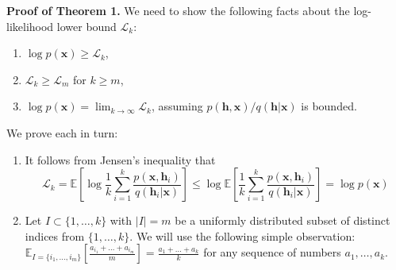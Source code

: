 \documentclass{article} %
\newcommand{\expect}{\mathbb{E}}
\newcommand{\hid}{\mathbf{h}}
\newcommand{\hidS}[1]{\hid_{#1}}
\newcommand{\obs}{\mathbf{x}}
\newcommand{\pmfGen}{p}
\newcommand{\pmfRec}{q}
\newcommand{\numSamples}{k}
\newcommand{\numSamplesTwo}{m}
\newcommand{\sampleIdx}{i}
\newcommand{\isBoundK}[1]{\mathcal{L}_{#1}}
\newcommand{\indices}{I}
\begin{document}
{\bf Proof of Theorem 1.} We need to show the following facts about the log-likelihood lower bound $\isBoundK{\numSamples}$:
 \begin{enumerate} 
 \item $\log \pmfGen(\obs) \geq \isBoundK{\numSamples}$,
 \item $\isBoundK{\numSamples}\geq \isBoundK{\numSamplesTwo}$ for $\numSamples\geq \numSamplesTwo$,
 \item $\log \pmfGen(\obs) = \lim_{\numSamples\to \infty} \isBoundK{\numSamples}$, assuming $\pmfGen(\hid, \obs) / \pmfRec(\hid | \obs)$ is bounded.
 \end{enumerate}
We prove each in turn:
\begin{enumerate}
\item
It follows from Jensen's inequality that
\begin{equation}
\isBoundK{\numSamples}=\expect\left[\log \frac{1}{\numSamples} \sum_{\sampleIdx=1}^\numSamples \frac{\pmfGen(\obs,\hidS{\sampleIdx})}{\pmfRec(\hidS{\sampleIdx}|\obs)}  \right]\leq \log \expect\left[\frac{1}{\numSamples} \sum_{\sampleIdx=1}^\numSamples \frac{\pmfGen(\obs,\hidS{\sampleIdx})}{\pmfRec(\hidS{\sampleIdx}|\obs)}  \right]=\log \pmfGen(\obs)
\end{equation}
\item Let $\indices\subset\{1,\ldots,\numSamples\}$ with $|\indices|=\numSamplesTwo$ be a uniformly distributed subset of distinct indices from $\{1,\ldots,\numSamples\}$. We will use the following simple observation: $\expect_{\indices=\{\sampleIdx_1,\ldots,\sampleIdx_\numSamplesTwo\}} \left[ \frac{a_{\sampleIdx_1}+\ldots+a_{\sampleIdx_\numSamplesTwo}}{\numSamplesTwo} \right] =\frac{a_1+\ldots+a_\numSamples}{\numSamples}$ for any sequence of numbers $a_1,\ldots,a_\numSamples$.


\end{enumerate}
\end{document}
